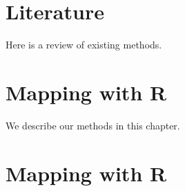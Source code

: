 \documentclass[]{book}
\begin{document}
\hypertarget{literature}{%
\chapter{Literature}\label{literature}}

Here is a review of existing methods.

\hypertarget{mapping-with-r}{%
\chapter{Mapping with R}\label{mapping-with-r}}

We describe our methods in this chapter.

\hypertarget{mapping-with-r-1}{%
\chapter{Mapping with R}\label{mapping-with-r-1}}


\end{document}

